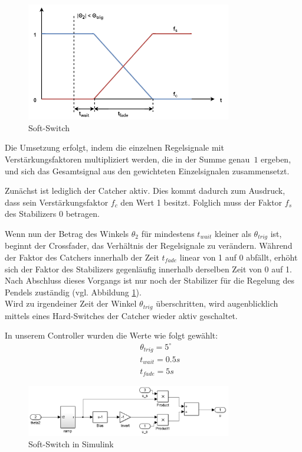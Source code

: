 \begin{figure}[htbp]
	\centering	
	\includegraphics[width=0.8\textwidth]{Grafiken/SoftSwitch.png}
	\caption{Soft-Switch}
	\label{fig.Soft-Switch}
\end{figure}

Die Umsetzung erfolgt, indem die einzelnen Regelsignale mit Verstärkungsfaktoren multipliziert werden, die in der Summe genau~$1$ ergeben, und sich das Gesamtsignal aus den gewichteten Einzelsignalen zusammensetzt.

Zunächst ist lediglich der Catcher aktiv. Dies kommt dadurch zum Ausdruck, dass sein Verstärkungsfaktor $f_c$ den Wert 1 besitzt. Folglich muss der Faktor $f_s$ des Stabilizers 0 betragen.

Wenn nun der Betrag des Winkels $\theta_2$ für mindestens $t_{wait}$ kleiner als $\theta_{trig}$ ist, beginnt der Crossfader, das Verhältnis der Regelsignale zu verändern.
Während der Faktor des Catchers innerhalb der Zeit $t_{fade}$ linear von 1 auf 0 abfällt, erhöht sich der Faktor des Stabilizers gegenläufig innerhalb derselben Zeit von 0 auf 1.
Nach Abschluss dieses Vorgangs ist nur noch der Stabilizer für die Regelung des Pendels zuständig (vgl. Abbildung \ref{fig.Soft-Switch}). \\

Wird zu irgendeiner Zeit der Winkel $\theta_{trig}$ überschritten, wird augenblicklich mittels eines Hard-Switches der Catcher wieder aktiv geschaltet.

In unserem Controller wurden die Werte wie folgt gewählt:
\begin{eqnarray*}
&& \theta_{trig} = 5^{\circ} \\
&& t_{wait} = 0.5 s \\
&& t_{fade} = 5 s
\end{eqnarray*}

\begin{figure}[htbp]
	\centering	
	\includegraphics[width=0.8\textwidth]{Grafiken/simulink_softswitch.png}
	\caption{Soft-Switch in Simulink}
	\label{fig.Simu_Soft-Switch}
\end{figure}

